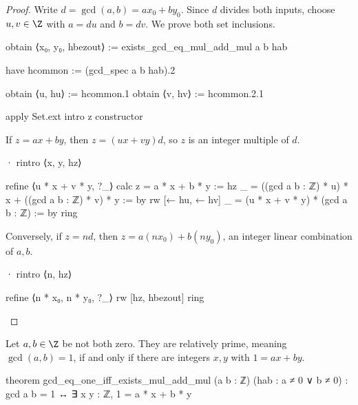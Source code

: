 \begin{proof}
  Write $d=\gcd(a,b)=ax_{0}+by_{0}$. Since $d$ divides both inputs, choose $u,v\in\Z$ with $a=du$ and $b=dv$. We prove both set inclusions.

  \begin{lean}
    obtain ⟨x₀, y₀, hbezout⟩ := exists_gcd_eq_mul_add_mul a b hab

    have hcommon := (gcd_spec a b hab).2

    obtain ⟨u, hu⟩ := hcommon.1
    obtain ⟨v, hv⟩ := hcommon.2.1

    apply Set.ext
    intro z
    constructor
  \end{lean}

  If $z=ax+by$, then $z=(ux+vy)d$, so $z$ is an integer multiple of $d$.

  \begin{lean}
    · rintro ⟨x, y, hz⟩

      refine ⟨u * x + v * y, ?_⟩
      calc
        z = a * x + b * y := hz
        _ = ((gcd a b : ℤ) * u) * x + ((gcd a b : ℤ) * v) * y := by
          rw [← hu, ← hv]
        _ = (u * x + v * y) * (gcd a b : ℤ) := by
          ring
  \end{lean}

  Conversely, if $z=nd$, then $z=a(nx_{0})+b(ny_{0})$, an integer linear combination of $a,b$.

  \begin{lean}
    · rintro ⟨n, hz⟩

      refine ⟨n * x₀, n * y₀, ?_⟩
      rw [hz, hbezout]
      ring
  \end{lean}
\end{proof}

\begin{theorem} \label{nt:thm:gcd-one-bezout}
  Let $a,b\in\Z$ be not both zero. They are relatively prime, meaning $\gcd(a,b)=1$, if and only if there are integers $x,y$ with $1=ax+by$.

  \begin{lean}
    theorem gcd_eq_one_iff_exists_mul_add_mul (a b : ℤ) (hab : a ≠ 0 ∨ b ≠ 0) :
        gcd a b = 1 ↔ ∃ x y : ℤ, 1 = a * x + b * y
  \end{lean}
\end{theorem}

